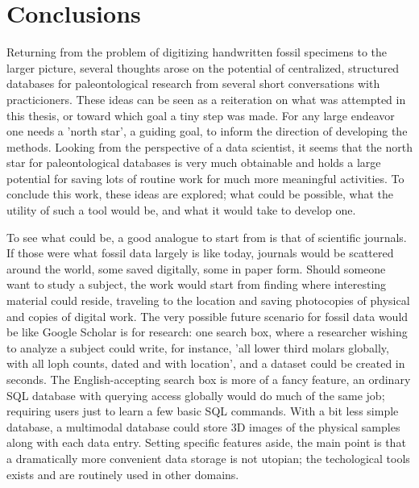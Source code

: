 \documentclass[english,twoside,openright]{UH_DS_MSc}
\begin{document}
\chapter{Conclusions}

Returning from the problem of digitizing handwritten fossil specimens to the larger picture, several thoughts arose on the potential of centralized, structured databases for paleontological research from several short conversations with practicioners.
These ideas can be seen as a reiteration on what was attempted in this thesis, or toward which goal a tiny step was made. For any large endeavor one needs a 'north star', a guiding goal, to inform the direction of developing the methods. Looking from the perspective of a data scientist, it seems that the north star for paleontological databases is very much obtainable and holds a large potential for saving lots of routine work for much more meaningful activities. To conclude this work, these ideas are explored; what could be possible, what the utility of such a tool would be, and what it would take to develop one.

To see what could be, a good analogue to start from is that of scientific journals. If those were what fossil data largely is like today, journals would be scattered around the world, some saved digitally, some in paper form. Should someone want to study a subject, the work would start from finding where interesting material could reside, traveling to the location and saving photocopies of physical and copies of digital work. The very possible future scenario for fossil data would be like Google Scholar is for research: one search box, where a researcher wishing to analyze a subject could write, for instance, 'all lower third molars globally, with all loph counts, dated and with location', and a dataset could be created in seconds. The English-accepting search box is more of a fancy feature, an ordinary SQL database with querying access globally would do much of the same job; requiring users just to learn a few basic SQL commands. With a bit less simple database, a multimodal database could store 3D images of the physical samples along with each data entry. Setting specific features aside, the main point is that a dramatically more convenient data storage is not utopian; the techological tools exists and are routinely used in other domains.
\end{document}
